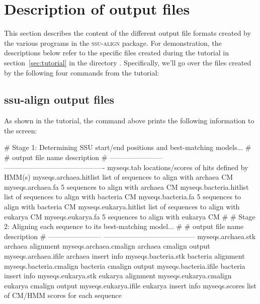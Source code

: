 \section{Description of output files}
\label{section:output}

This section describes the content of the different output file
formats created by the various programs in the \textsc{ssu-align}
package. For demonstration, the descriptions below refer to the
specific files created during the tutorial in
section~\ref{sec:tutorial} in the directory . 
Specifically, we'll go over the files created by the following four
commands from the tutorial:





\subsection{ssu-align output files}

As shown in the tutorial, the  command above prints
the following information to the screen:

\begin{sreoutput}
# Stage 1: Determining SSU start/end positions and best-matching models...
#
# output file name         description                                
# -----------------------  -------------------------------------------
  myseqs.tab               locations/scores of hits defined by HMM(s)
  myseqs.archaea.hitlist   list of sequences to align with archaea CM
  myseqs.archaea.fa              5 sequences to align with archaea CM
  myseqs.bacteria.hitlist  list of sequences to align with bacteria CM
  myseqs.bacteria.fa             5 sequences to align with bacteria CM
  myseqs.eukarya.hitlist   list of sequences to align with eukarya CM
  myseqs.eukarya.fa              5 sequences to align with eukarya CM
#
# Stage 2: Aligning each sequence to its best-matching model...
#
# output file name         description
# -----------------------  ---------------------------------------
  myseqs.archaea.stk       archaea alignment
  myseqs.archaea.cmalign   archaea cmalign output
  myseqs.archaea.ifile     archaea insert info
  myseqs.bacteria.stk      bacteria alignment
  myseqs.bacteria.cmalign  bacteria cmalign output
  myseqs.bacteria.ifile    bacteria insert info
  myseqs.eukarya.stk       eukarya alignment
  myseqs.eukarya.cmalign   eukarya cmalign output
  myseqs.eukarya.ifile     eukarya insert info
  myseqs.scores            list of CM/HMM scores for each sequence
\end{sreoutput}

